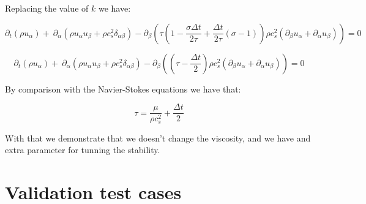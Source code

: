 \documentclass{article}
\begin{document}
Replacing the value of $k$ we have:

\begin{equation*}
    \partial _{t}( \rho u_{\alpha }) +\ \partial _{\alpha }\left( \rho u_{\alpha } u_{\beta } +\rho c_{s}^{2} \delta _{\alpha \beta }\right) -\partial _{\beta }\left( \tau \left( 1-\frac{\sigma\Delta t}{2\tau} + \frac{\Delta t}{2\tau}(\sigma-1)\right) \rho c_{s}^{2}( \partial _{\beta } u_{\alpha } +\partial _{\alpha } u_{\beta })\right) = 0
\end{equation*}

\begin{equation*}
    \partial _{t}( \rho u_{\alpha }) +\ \partial _{\alpha }\left( \rho u_{\alpha } u_{\beta } +\rho c_{s}^{2} \delta _{\alpha \beta }\right) -\partial _{\beta }\left(  \left( \tau-\frac{\Delta t}{2}\right) \rho c_{s}^{2}( \partial _{\beta } u_{\alpha } +\partial _{\alpha } u_{\beta })\right) = 0
\end{equation*}

By comparison with the Navier-Stokes equations we have that:

\begin{equation}
    \tau =\frac{\mu }{\rho c_{s}^{2}} +\frac{\Delta t}{2}
\end{equation}

With that we demonstrate that we doesn't change the viscosity, and we have and extra parameter for tunning the stability.
\section{Validation test cases}
\end{document}
